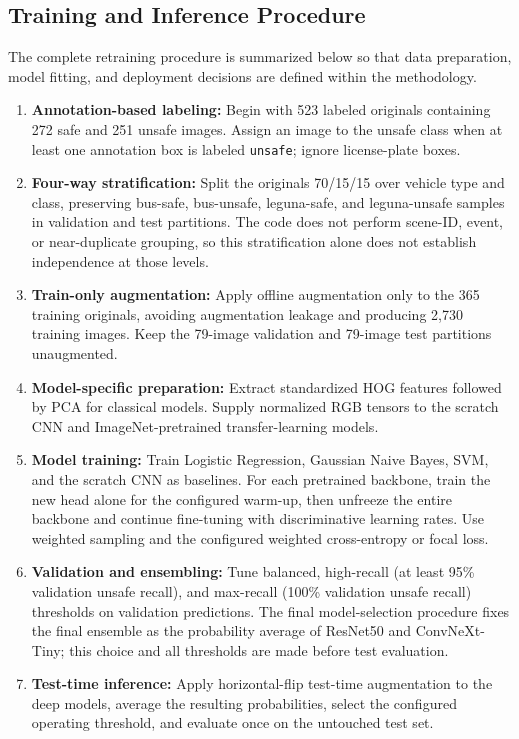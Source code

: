 \documentclass{article}
\begin{document}
\subsection{Training and Inference Procedure}
The complete retraining procedure is summarized below so that data preparation, model fitting, and deployment decisions are defined within the methodology.
\begin{enumerate}
    \item \textbf{Annotation-based labeling:} Begin with 523 labeled originals containing 272 safe and 251 unsafe images. Assign an image to the unsafe class when at least one annotation box is labeled \texttt{unsafe}; ignore license-plate boxes.
    \item \textbf{Four-way stratification:} Split the originals 70/15/15 over vehicle type and class, preserving bus-safe, bus-unsafe, leguna-safe, and leguna-unsafe samples in validation and test partitions. The code does not perform scene-ID, event, or near-duplicate grouping, so this stratification alone does not establish independence at those levels.
    \item \textbf{Train-only augmentation:} Apply offline augmentation only to the 365 training originals, avoiding augmentation leakage and producing 2,730 training images. Keep the 79-image validation and 79-image test partitions unaugmented.
    \item \textbf{Model-specific preparation:} Extract standardized HOG features followed by PCA for classical models. Supply normalized RGB tensors to the scratch CNN and ImageNet-pretrained transfer-learning models.
    \item \textbf{Model training:} Train Logistic Regression, Gaussian Naive Bayes, SVM, and the scratch CNN as baselines. For each pretrained backbone, train the new head alone for the configured warm-up, then unfreeze the entire backbone and continue fine-tuning with discriminative learning rates. Use weighted sampling and the configured weighted cross-entropy or focal loss.
    \item \textbf{Validation and ensembling:} Tune balanced, high-recall (at least 95\% validation unsafe recall), and max-recall (100\% validation unsafe recall) thresholds on validation predictions. The final model-selection procedure fixes the final ensemble as the probability average of ResNet50 and ConvNeXt-Tiny; this choice and all thresholds are made before test evaluation.
    \item \textbf{Test-time inference:} Apply horizontal-flip test-time augmentation to the deep models, average the resulting probabilities, select the configured operating threshold, and evaluate once on the untouched test set.
\end{enumerate}
\end{document}

